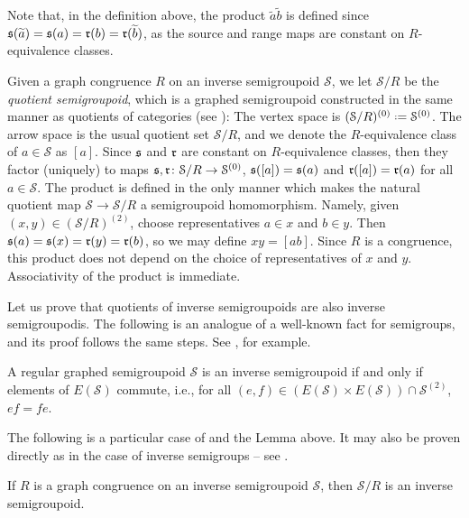 Note that, in the definition above, the product $\widetilde{a}\widetilde{b}$ is defined since $\operatorname{\mathfrak{s}}(\widetilde{a})=\operatorname{\mathfrak{s}}(a)=\operatorname{\mathfrak{r}}(b)=\operatorname{\mathfrak{r}}(\widetilde{b})$, as the source and range maps are constant on $R$-equivalence classes.

Given a graph congruence $R$ on an inverse semigroupoid $\mathcal{S}$, we let $\mathcal{S}/R$ be the \emph{quotient semigroupoid}, which is a graphed semigroupoid constructed in the same manner as quotients of categories (see \cite[Section 2.8]{MR1712872}): The vertex space is $(\mathcal{S}/R)^{(0)}\defeq\mathcal{S}^{(0)}$. The arrow space is the usual quotient set $\mathcal{S}/R$, and we denote the $R$-equivalence class of $a\in\mathcal{S}$ as $[a]$. Since $\operatorname{\mathfrak{s}}$ and $\operatorname{\mathfrak{r}}$ are constant on $R$-equivalence classes, then they factor (uniquely) to maps $\operatorname{\mathfrak{s}},\operatorname{\mathfrak{r}}\colon\mathcal{S}/R\to\mathcal{S}^{(0)}$, $\operatorname{\mathfrak{s}}([a])=\operatorname{\mathfrak{s}}(a)$ and $\operatorname{\mathfrak{r}}([a])=\operatorname{\mathfrak{r}}(a)$ for all $a\in\mathcal{S}$. The product is defined in the only manner which makes the natural quotient map $\mathcal{S}\to\mathcal{S}/R$ a semigroupoid homomorphism. Namely, given $(x,y)\in (\mathcal{S}/R)^{(2)}$, choose representatives $a\in x$ and $b\in y$. Then $\operatorname{\mathfrak{s}}(a)=\operatorname{\mathfrak{s}}(x)=\operatorname{\mathfrak{r}}(y)=\operatorname{\mathfrak{r}}(b)$, so we may define $xy=[ab]$. Since $R$ is a congruence, this product does not depend on the choice of representatives of $x$ and $y$. Associativity of the product is immediate.

Let us prove that quotients of inverse semigroupoids are also inverse semigroupodis. The following is an analogue of a well-known fact for semigroups, and its proof follows the same steps. See \cite[Theorem 5.1.1]{MR1455373}, for example.

\begin{lemma}[{\cite[Lemma 3.3.1]{MR3597709}}]\label{lem:regularisinverseiffidempotentscommute}
A regular graphed semigroupoid $\mathcal{S}$ is an inverse semigroupoid if and only if elements of $E(\mathcal{S})$ commute, i.e., for all $(e,f)\in (E(\mathcal{S})\times E(\mathcal{S}))\cap \mathcal{S}^{(2)}$, $ef=fe$.
\end{lemma}

The following is a particular case of \cite[Lemma 3.3.3]{MR3597709} and the Lemma above. It may also be proven directly as in the case of inverse semigroups -- see \cite[Proposition 2.1.1(iii)]{MR1724106}.

\begin{proposition}
If $R$ is a graph congruence on an inverse semigroupoid $\mathcal{S}$, then $\mathcal{S}/R$ is an inverse semigroupoid.
\end{proposition}

